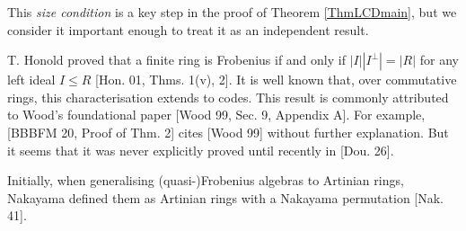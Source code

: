 \documentclass{article}
\theoremstyle{plain}
\theoremstyle{plain}
\theoremstyle{remark}
\theoremstyle{plain}
\begin{document}
This \textit{size condition} is a key step in the proof of Theorem \ref{ThmLCDmain}, but we consider it important enough to treat it as an independent result.


T. Honold proved that a finite ring is Frobenius if and only if  $|I||I^\perp|=|R|$ for any left ideal $I\leq R$ [Hon. 01, Thms. 1(v), 2]. It is well known that, over commutative rings, this characterisation extends to codes. This result is commonly attributed to Wood's foundational paper [Wood 99, Sec. 9, Appendix A]. For example, [BBBFM 20, Proof of Thm. 2] cites [Wood 99] without further explanation. But it seems that it was never explicitly proved until recently in [Dou. 26].



\medskip 

Initially, when generalising (quasi-)Frobenius algebras to Artinian rings, Nakayama defined them as Artinian rings with a Nakayama permutation [Nak. 41]. %
\end{document}

